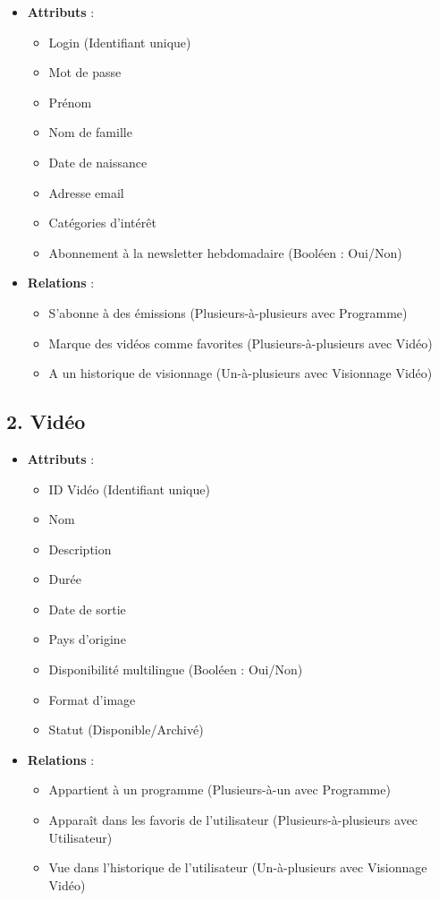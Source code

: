 \documentclass[a4paper, 12pt]{article}
\begin{document}
\begin{itemize}
    \item \textbf{Attributs} :
    \begin{itemize}
        \item Login (Identifiant unique)
        \item Mot de passe
        \item Prénom
        \item Nom de famille
        \item Date de naissance
        \item Adresse email
        \item Catégories d'intérêt
        \item Abonnement à la newsletter hebdomadaire (Booléen : Oui/Non)
    \end{itemize}
    \item \textbf{Relations} :
    \begin{itemize}
        \item S'abonne à des émissions (Plusieurs-à-plusieurs avec Programme)
        \item Marque des vidéos comme favorites (Plusieurs-à-plusieurs avec Vidéo)
        \item A un historique de visionnage (Un-à-plusieurs avec Visionnage Vidéo)
    \end{itemize}
\end{itemize}

\subsection*{2. Vidéo}

\begin{itemize}
    \item \textbf{Attributs} :
    \begin{itemize}
        \item ID Vidéo (Identifiant unique)
        \item Nom
        \item Description
        \item Durée
        \item Date de sortie
        \item Pays d'origine
        \item Disponibilité multilingue (Booléen : Oui/Non)
        \item Format d'image
        \item Statut (Disponible/Archivé)
    \end{itemize}
    \item \textbf{Relations} :
    \begin{itemize}
        \item Appartient à un programme (Plusieurs-à-un avec Programme)
        \item Apparaît dans les favoris de l'utilisateur (Plusieurs-à-plusieurs avec Utilisateur)
        \item Vue dans l'historique de l'utilisateur (Un-à-plusieurs avec Visionnage Vidéo)
    \end{itemize}
\end{itemize}
\end{document}
